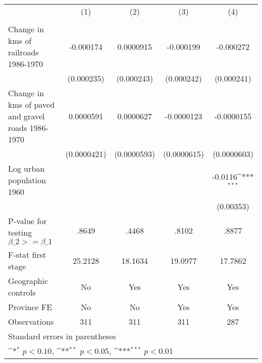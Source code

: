 {
\def\sym#1{\ifmmode^{#1}\else\(^{#1}\)\fi}
\begin{tabular}{l*{4}{c}}
\hline\hline
                &\multicolumn{1}{c}{(1)}&\multicolumn{1}{c}{(2)}&\multicolumn{1}{c}{(3)}&\multicolumn{1}{c}{(4)}\\
                &\multicolumn{1}{c}{}&\multicolumn{1}{c}{}&\multicolumn{1}{c}{}&\multicolumn{1}{c}{}\\
\hline
Change in kms of railroads 1986-1970&-0.000174         &0.0000915         &-0.000199         &-0.000272         \\
                &(0.000235)         &(0.000243)         &(0.000242)         &(0.000241)         \\
[1em]
Change in kms of paved and gravel roads 1986-1970&0.0000591         &0.0000627         &-0.0000123         &-0.0000155         \\
                &(0.0000421)         &(0.0000593)         &(0.0000615)         &(0.0000603)         \\
[1em]
Log urban population 1960&                  &                  &                  &  -0.0116\sym{***}\\
                &                  &                  &                  &(0.00353)         \\
\hline
P-value for testing $\beta\_{2} >= \beta\_{1}$&    .8649         &    .4468         &    .8102         &    .8877         \\
F-stat first stage&  25.2128         &  18.1634         &  19.0977         &  17.7862         \\
Geographic controls&       No         &      Yes         &      Yes         &      Yes         \\
Province FE     &       No         &       No         &      Yes         &      Yes         \\
Observations    &      311         &      311         &      311         &      287         \\
\hline\hline
\multicolumn{5}{l}{\footnotesize Standard errors in parentheses}\\
\multicolumn{5}{l}{\footnotesize \sym{*} \(p<0.10\), \sym{**} \(p<0.05\), \sym{***} \(p<0.01\)}\\
\end{tabular}
}
